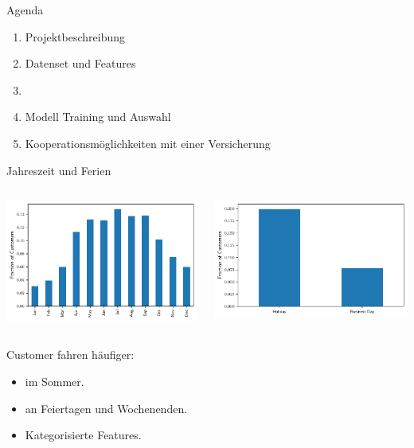 \begin{frame}{Agenda}
\centering
\myBlock[0.6]{}
{
\begin{enumerate}
\item Projektbeschreibung
\item Datenset und Features
\item {}
\item Modell Training und Auswahl
\item Kooperationsmöglichkeiten mit einer Versicherung
\end{enumerate}
}
\end{frame}

\begin{frame}{Jahreszeit und Ferien}
\begin{columns}
\begin{column}{0.5\linewidth }
\centering
\includegraphics[width=\linewidth]{../Images/CountByMonthCustomers}
\end{column}
\begin{column}{0.5\linewidth }
\centering
\includegraphics[width=\linewidth]{../Images/CountByBusinessCustomers}
\end{column}
\end{columns}

{
Customer fahren häufiger:
\begin{itemize}
\item im Sommer.
\item an Feiertagen und Wochenenden.
\item Kategorisierte Features.
\end{itemize}
}
\end{frame}

